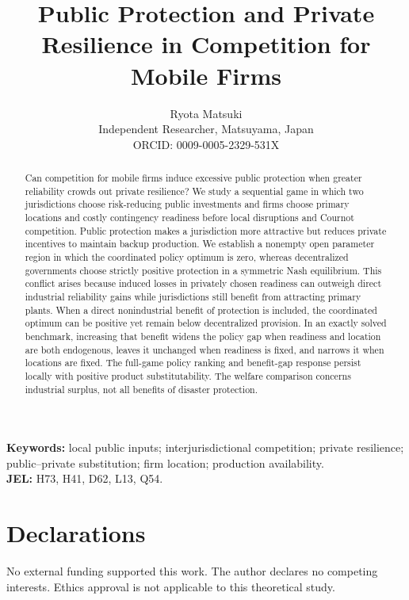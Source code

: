 \documentclass[11pt]{article}
\title{\textbf{Public Protection and Private Resilience in Competition for Mobile Firms}}
\author{Ryota Matsuki\\
\small Independent Researcher, Matsuyama, Japan\\
\small ORCID: 0009-0005-2329-531X}
\date{}
\theoremstyle{remark}
\begin{document}
\maketitle

\begin{abstract}
Can competition for mobile firms induce excessive public protection when greater reliability crowds out private resilience? We study a sequential game in which two jurisdictions choose risk-reducing public investments and firms choose primary locations and costly contingency readiness before local disruptions and Cournot competition. Public protection makes a jurisdiction more attractive but reduces private incentives to maintain backup production. We establish a nonempty open parameter region in which the coordinated policy optimum is zero, whereas decentralized governments choose strictly positive protection in a symmetric Nash equilibrium. This conflict arises because induced losses in privately chosen readiness can outweigh direct industrial reliability gains while jurisdictions still benefit from attracting primary plants. When a direct nonindustrial benefit of protection is included, the coordinated optimum can be positive yet remain below decentralized provision. In an exactly solved benchmark, increasing that benefit widens the policy gap when readiness and location are both endogenous, leaves it unchanged when readiness is fixed, and narrows it when locations are fixed. The full-game policy ranking and benefit-gap response persist locally with positive product substitutability. The welfare comparison concerns industrial surplus, not all benefits of disaster protection.
\end{abstract}

\noindent\textbf{Keywords:} local public inputs; interjurisdictional competition; private resilience; public--private substitution; firm location; production availability.\\
\textbf{JEL:} H73, H41, D62, L13, Q54.













\section*{Declarations}
No external funding supported this work. The author declares no competing interests. Ethics approval is not applicable to this theoretical study.
\end{document}
